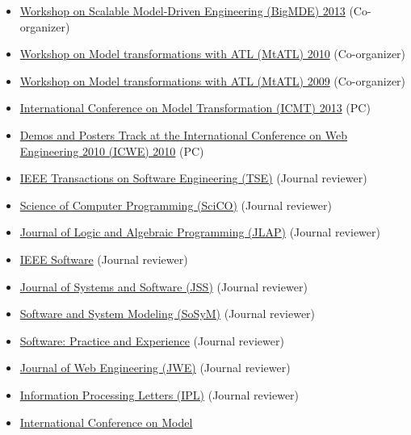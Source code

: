 \begin{itemize}
\tightlist
\item
  \href{https://big-mde.github.io/2013.html}{Workshop on Scalable
  Model-Driven Engineering (BigMDE) 2013} (Co-organizer)
\item
  \href{http://web.emn.fr/x-info/atlanmod/index.php?title=MtATL2010}{Workshop
  on Model transformations with ATL (MtATL) 2010} (Co-organizer)
\item
  \href{http://web.emn.fr/x-info/atlanmod/index.php?title=MtATL2009}{Workshop
  on Model transformations with ATL (MtATL) 2009} (Co-organizer)
\item
  \href{http://www.model-transformation.org/ICMT2013/}{International
  Conference on Model Transformation (ICMT) 2013} (PC)
\item
  \href{http://icwe2010.webengineering.org/Calls/demos.aspx}{Demos and
  Posters Track at the International Conference on Web Engineering 2010
  (ICWE) 2010} (PC)
\item
  \href{https://www.computer.org/web/tse;jsessionid=6afd856a99689b17c0c58edc329c}{IEEE
  Transactions on Software Engineering (TSE)} (Journal reviewer)
\item
  \href{http://www.journals.elsevier.com/science-of-computer-programming/}{Science
  of Computer Programming (SciCO)} (Journal reviewer)
\item
  \href{http://www.journals.elsevier.com/the-journal-of-logic-and-algebraic-programming}{Journal
  of Logic and Algebraic Programming (JLAP)} (Journal reviewer)
\item
  \href{https://www.computer.org/software-magazine/}{IEEE Software}
  (Journal reviewer)
\item
  \href{http://www.journals.elsevier.com/journal-of-systems-and-software}{Journal
  of Systems and Software (JSS)} (Journal reviewer)
\item
  \href{http://www.sosym.org/}{Software and System Modeling (SoSyM)}
  (Journal reviewer)
\item
  \href{http://onlinelibrary.wiley.com/journal/10.1002/(ISSN)1097-024X}{Software:
  Practice and Experience} (Journal reviewer)
\item
  \href{http://www.rintonpress.com/journals/jwe/}{Journal of Web
  Engineering (JWE)} (Journal reviewer)
\item
  \href{http://www.journals.elsevier.com/information-processing-letters/}{Information
  Processing Letters (IPL)} (Journal reviewer)
\item
  \href{http://models2010.ifi.uio.no/}{International Conference on Model
}
\end{itemize}
